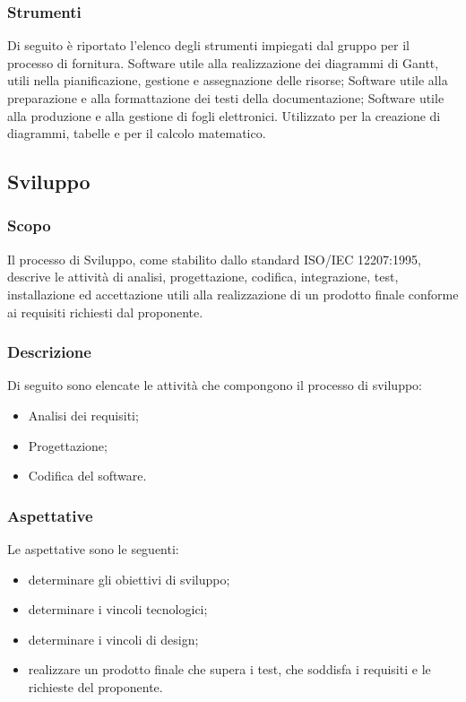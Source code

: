 \subsubsection{Strumenti}
Di seguito è riportato l’elenco degli strumenti impiegati dal gruppo per il processo di fornitura.
Software utile alla realizzazione dei diagrammi di Gantt, utili nella pianificazione, gestione e assegnazione delle risorse;
Software utile alla preparazione e alla formattazione dei testi della documentazione;
Software utile alla produzione e alla gestione di fogli elettronici. Utilizzato per la creazione di diagrammi, tabelle e per il calcolo matematico.
\subsection{Sviluppo}
\subsubsection{Scopo}
Il processo di Sviluppo, come stabilito dallo standard ISO/IEC 12207:1995, descrive le attività di analisi, progettazione, codifica, integrazione, test, installazione ed accettazione utili alla realizzazione di un prodotto finale conforme ai requisiti richiesti dal proponente.
\subsubsection{Descrizione}
Di seguito sono elencate le attività che compongono il processo di sviluppo:
\begin{itemize}
    \item Analisi dei requisiti;
    \item Progettazione;
    \item Codifica del software.
\end{itemize}
\subsubsection{Aspettative}
Le aspettative sono le seguenti:
\begin{itemize}
    \item determinare gli obiettivi di sviluppo;
    \item determinare i vincoli tecnologici;
    \item determinare i vincoli di design;
    \item realizzare un prodotto finale che supera i test, che soddisfa i requisiti e le richieste del proponente.
\end{itemize}
